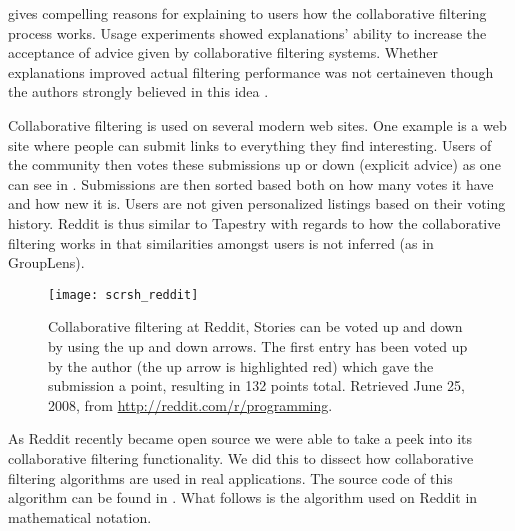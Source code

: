 \citet[]{herlocker00} gives compelling reasons for explaining to
users how the collaborative filtering process works. Usage experiments
showed explanations' ability to increase the acceptance of advice given by
collaborative filtering systems. Whether explanations improved actual
filtering performance was not certain\dash{}even though the authors
strongly believed in this idea
\citep[]{herlocker00}.

Collaborative filtering is used on several modern web sites. One example is
\dash{}a web site where people can submit links to everything
they find interesting. Users of the community then votes these submissions up
or down (explicit advice) as one can see in .
Submissions are then
sorted based both on how many votes it have and how new it is. Users are not
given personalized listings based on their voting history. Reddit is thus
similar to Tapestry with regards to how the collaborative filtering works in
that similarities amongst users is not inferred (as in GroupLens).

\begin{figure}
  \texttt{[image: scrsh\_reddit]}
  \caption[Collaborative Filtering at Reddit]{
    Collaborative filtering at Reddit, Stories can be voted up and down
    by using the up and down arrows. The first entry has been voted up by
    the author (the up arrow is highlighted red) which gave the submission
    a point, resulting in 132 points total.
    Retrieved June 25, 2008, from
    \url{http://reddit.com/r/programming}.
  }
  \label{figure:scrsh.reddit}
\end{figure}

As Reddit recently became open source%
we were able to take a peek into its
collaborative filtering functionality. We did this to dissect how
collaborative filtering algorithms are used in real applications. The source
code of this algorithm can be found in
.
What follows is the algorithm used on Reddit in mathematical notation.

